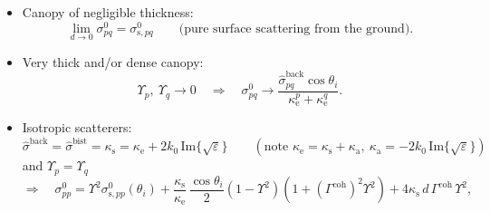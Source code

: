 \documentclass[11pt, oneside]{article}
\newcommand{\ke}[1]{\kappa_\mathrm{e}^{#1}}
\newcommand{\sback}{\hat{\sigma}^\mathrm{back}_{pq}}
\begin{document}
\begin{itemize}
	\item Canopy of negligible thickness:
	\begin{equation}
		\label{e:thin}
		\lim_{d\to0}\sigma^0_{pq} = \sigma^0_{\mathrm{s},pq} \qquad \text{(pure surface scattering from the ground)}.
	\end{equation}
	\item Very thick and/or dense canopy:
	\begin{equation}
		\label{e:thick}
		\Upsilon_p,\ \Upsilon_q \rightarrow 0 \quad\Rightarrow\quad \sigma^0_{pq} \rightarrow \frac{\sback\cos\theta_i}{\ke{p}+\ke{q}}.
	\end{equation}
	\item Isotropic scatterers:
	\begin{equation}
		\label{e:iso_s}
		\hat{\sigma}^\mathrm{back} = \hat{\sigma}^\mathrm{bist} = \kappa_\mathrm{s} = \kappa_\mathrm{e} + 2k_0\,\mathrm{Im}\{\sqrt{\varepsilon}\}
		\qquad \left(\text{note } \kappa_\mathrm{e} = \kappa_\mathrm{s} + \kappa_\mathrm{a},\ \kappa_\mathrm{a} = -2k_0\,\mathrm{Im}\{\sqrt{\varepsilon}\}\right)
	\end{equation}
	and $\Upsilon_p = \Upsilon_q$
	\begin{equation}
		\label{e:iso}
		\Rightarrow\quad \sigma^0_{pp} = \Upsilon^2\sigma^0_{\mathrm{s},pp}(\theta_i) + \frac{\kappa_\mathrm{s}}{\kappa_\mathrm{e}}\,\frac{\cos\theta_i}{2}\left(1 - \Upsilon^2\right)\left(1 + (\Gamma^\mathrm{coh})^2\Upsilon^2\right) + 4\kappa_\mathrm{s}\,d\,\Gamma^\mathrm{coh}\,\Upsilon^2,

\end{equation}
\end{itemize}
\end{document}
